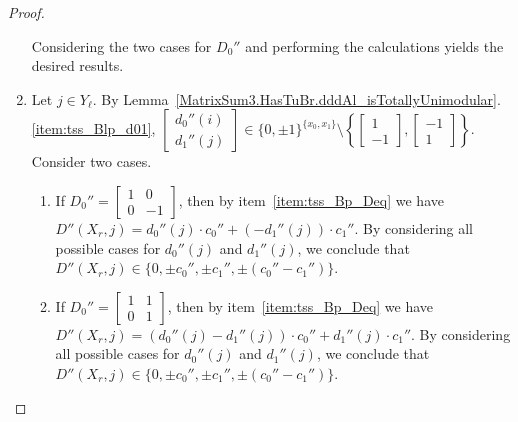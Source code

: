 \begin{proof}
\begin{enumerate}
\[        \]
        Considering the two cases for $D_{0}''$ and performing the calculations yields the desired results.

        \item Let $j \in Y_{\ell}$. By Lemma~\ref{MatrixSum3.HasTuBr.dddAl_isTotallyUnimodular}.\ref{item:tss_Blp_d01}, $\begin{bmatrix} d_{0}'' (i) \\ d_{1}'' (j) \end{bmatrix} \in \{0, \pm 1\}^{\{x_{0}, x_{1}\}} \setminus \left\{ \begin{bmatrix} 1 \\ -1 \end{bmatrix}, \begin{bmatrix} -1 \\ 1 \end{bmatrix} \right\}$. Consider two cases.
        \begin{enumerate}
            \item If $D_{0}'' = \begin{bmatrix} 1 & 0 \\ 0 & -1 \end{bmatrix}$, then by item~\ref{item:tss_Bp_Deq} we have $D'' (X_{r}, j) = d_{0}'' (j) \cdot c_{0}''  + (-d_{1}'' (j)) \cdot c_{1}''$. By considering all possible cases for $d_{0}'' (j)$ and $d_{1}'' (j)$, we conclude that $D'' (X_{r}, j) \in \{0, \pm c_{0}'', \pm c_{1}'', \pm (c_{0}'' - c_{1}'')\}$.
            \item If $D_{0}'' = \begin{bmatrix} 1 & 1 \\ 0 & 1 \end{bmatrix}$, then by item~\ref{item:tss_Bp_Deq} we have $D'' (X_{r}, j) = (d_{0}'' (j) - d_{1}'' (j)) \cdot c_{0}''  + d_{1}'' (j) \cdot c_{1}''$. By considering all possible cases for $d_{0}'' (j)$ and $d_{1}'' (j)$, we conclude that $D'' (X_{r}, j) \in \{0, \pm c_{0}'', \pm c_{1}'', \pm (c_{0}'' - c_{1}'')\}$.
        \end{enumerate}


\end{enumerate}
\end{proof}
